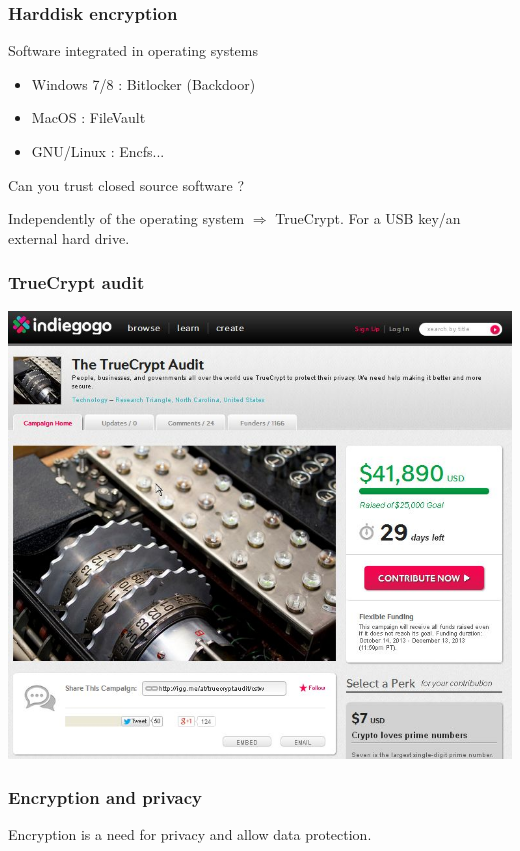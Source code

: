 \begin{frame}

\frametitle{Harddisk encryption}
\begin{block}{Software integrated in operating systems}
\begin{itemize}
\item Windows 7/8 : Bitlocker (Backdoor)
\item MacOS : FileVault
\item GNU/Linux : Encfs...
\end{itemize}
Can you trust closed source software ?
\end{block}

\begin{block}{Independently of the operating system}
$\Rightarrow$ TrueCrypt. For a USB key/an external hard drive.
\end{block}
\end{frame}

\begin{frame}
\frametitle{TrueCrypt audit}
\begin{center}
\includegraphics[scale=0.45] {./materials/truecryptaudit.jpg} 
\end{center}
\end{frame}

\begin{frame}
\frametitle{Encryption and privacy}
\begin{center}
\huge{Encryption is a need for privacy and allow data protection.}
\end{center}
\end{frame}
